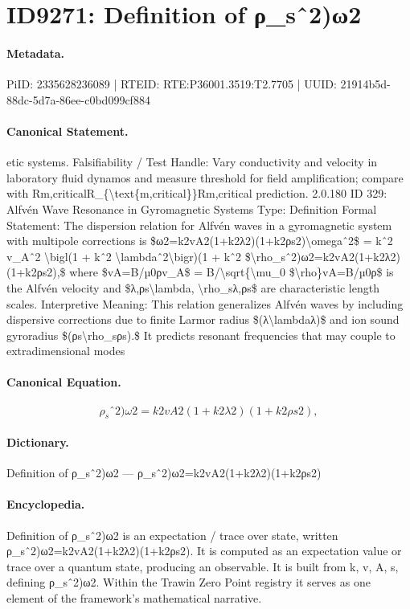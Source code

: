 \section*{ID9271: Definition of ρ\_sˆ2)ω2}
\paragraph{Metadata.}
PiID: 2335628236089 | RTEID: RTE:P36001.3519:T2.7705 | UUID: 21914b5d-88dc-5d7a-86ee-c0bd099cf884

\paragraph{Canonical Statement.}
etic systems. Falsifiability / Test Handle: Vary conductivity and velocity in laboratory fluid dynamos and measure threshold for field amplification; compare with Rm,criticalR\_\{\textbackslash{}text\{m,critical\}\}Rm,critical prediction. 2.0.180 ID 329: Alfvén Wave Resonance in Gyromagnetic Systems Type: Definition Formal Statement: The dispersion relation for Alfvén waves in a gyromagnetic system with multipole corrections is \$ω2=k2vA2(1+k2λ2)(1+k2ρs2)\textbackslash{}omegaˆ2\$ = kˆ2 v\_Aˆ2 \textbackslash{}bigl(1 + kˆ2 \textbackslash{}lambdaˆ2\textbackslash{}bigr)(1 + kˆ2 \$\textbackslash{}rho\_sˆ2)ω2=k2vA2(1+k2λ2)(1+k2ρs2),\$ where \$vA=B/µ0ρv\_A\$ = B/\textbackslash{}sqrt\{\textbackslash{}mu\_0 \$\textbackslash{}rho\}vA=B/µ0ρ\$ is the Alfvén velocity and \$λ,ρs\textbackslash{}lambda, \textbackslash{}rho\_sλ,ρs\$ are characteristic length scales. Interpretive Meaning: This relation generalizes Alfvén waves by including dispersive corrections due to finite Larmor radius \$(λ\textbackslash{}lambdaλ)\$ and ion sound gyroradius \$(ρs\textbackslash{}rho\_sρs).\$ It predicts resonant frequencies that may couple to extradimensional modes

\paragraph{Canonical Equation.}
\[
\rho_sˆ2)ω2=k2vA2(1+k2λ2)(1+k2ρs2),
\]

\paragraph{Dictionary.}
Definition of ρ\_sˆ2)ω2 — ρ\_sˆ2)ω2=k2vA2(1+k2λ2)(1+k2ρs2)

\paragraph{Encyclopedia.}
Definition of ρ\_sˆ2)ω2 is an expectation / trace over state, written ρ\_sˆ2)ω2=k2vA2(1+k2λ2)(1+k2ρs2). It is computed as an expectation value or trace over a quantum state, producing an observable. It is built from k, v, A, s, defining ρ\_sˆ2)ω2. Within the Trawin Zero Point registry it serves as one element of the framework's mathematical narrative.
